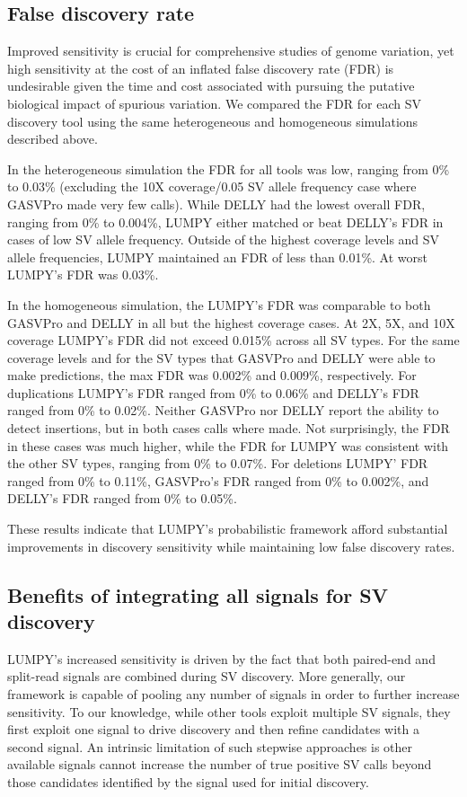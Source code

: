 \documentclass[10pt]{bmc_article}
\newenvironment{bmcformat}{\begin{raggedright}\baselineskip20pt\sloppy\setboolean{publ}{false}}{\end{raggedright}\baselineskip20pt\sloppy}
\begin{document}
\begin{bmcformat}
\subsection*{False discovery rate}
Improved sensitivity is crucial for comprehensive studies of genome variation,
yet high sensitivity at the cost of an inflated false discovery rate (FDR) is
undesirable given the time and cost associated with pursuing the putative
biological impact of spurious variation.  We compared the FDR for each SV
discovery tool using the same heterogeneous and homogeneous simulations
described above.

In the heterogeneous simulation the FDR for all tools was low, ranging from 0\%
to 0.03\% (excluding the 10X coverage/0.05 SV allele frequency case where
GASVPro made very few calls).  While DELLY had the lowest overall FDR, ranging
from 0\% to 0.004\%, LUMPY either matched or beat DELLY’s FDR in cases of low SV
allele frequency.  Outside of the highest coverage levels and SV allele
frequencies, LUMPY maintained an FDR of less than 0.01\%.  At worst LUMPY's FDR
was 0.03\%.

In the homogeneous simulation, the LUMPY’s FDR was comparable to both GASVPro and
DELLY in all but the highest coverage cases.   At 2X, 5X, and 10X coverage
LUMPY’s FDR did not exceed 0.015\% across all SV types.  For the same coverage
levels and for the SV types that GASVPro and DELLY were able to make
predictions, the max FDR was 0.002\% and 0.009\%, respectively.  For
duplications LUMPY’s FDR ranged from 0\% to 0.06\% and DELLY’s FDR ranged from
0\% to 0.02\%.  Neither GASVPro nor DELLY report the ability to detect
insertions, but in both cases calls where made.  Not surprisingly, the FDR in
these cases was much higher, while the FDR for LUMPY was consistent with the
other SV types, ranging from 0\% to 0.07\%.  For deletions LUMPY’ FDR ranged
from 0\% to 0.11\%, GASVPro’s FDR ranged from 0\% to 0.002\%, and DELLY’s FDR
ranged from 0\% to 0.05\%.

These results indicate that LUMPY’s probabilistic framework afford substantial
improvements in discovery sensitivity while maintaining low false discovery
rates.

\subsection*{Benefits of integrating all signals for SV discovery}

LUMPY's increased sensitivity is driven by the fact that both paired-end and
split-read signals are combined during SV discovery. More generally, our
framework is capable of pooling any number of signals in order to further
increase sensitivity. To our knowledge, while other tools exploit multiple SV
signals, they first exploit one signal to drive discovery and then refine
candidates with a second signal. An intrinsic limitation of such stepwise
approaches is other available signals cannot increase the number of true
positive SV calls beyond those candidates identified by the signal used for
initial discovery. 


\end{bmcformat}
\end{document}
